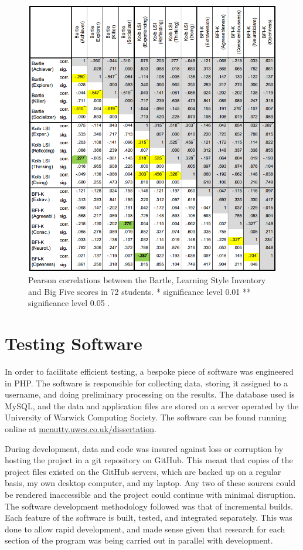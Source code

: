 \documentclass[12pt,a4paper,twoside]{report}
\begin{document}
\begin{figure}
\begin{center}
	\includegraphics[width=1\textwidth]{../img/bartle-big5.png}
	\caption{Pearson correlations between the Bartle, Learning Style Inventory and Big Five scores in 72 students. * significance level 0.01 ** significance level 0.05  \cite{konertmodeling}.}
	\label{correlation}
\end{center}
\end{figure}

\chapter{Testing Software}
\label{sec:software}
In order to facilitate efficient testing, a bespoke piece of software was engineered in PHP. The software is responsible for collecting data, storing it assigned to a username, and doing preliminary processing on the results. The database used is MySQL, and the data and application files are stored on a server operated by the University of Warwick Computing Society. The software can be found running online at \url{mcnutty.uwcs.co.uk/dissertation}.

During development, data and code was insured against loss or corruption by hosting the project in a git repository on GitHub. This meant that copies of the project files existed on the GitHub servers, which are backed up on a regular basis, my own desktop computer, and my laptop. Any two of these sources could be rendered inaccessible and the project could continue with minimal disruption. The software development methodology followed was that of incremental builds. Each feature of the software is built, tested, and integrated separately. This was done to allow rapid development, and made sense given that research for each section of the program was being carried out in parallel with development.
\end{document}

